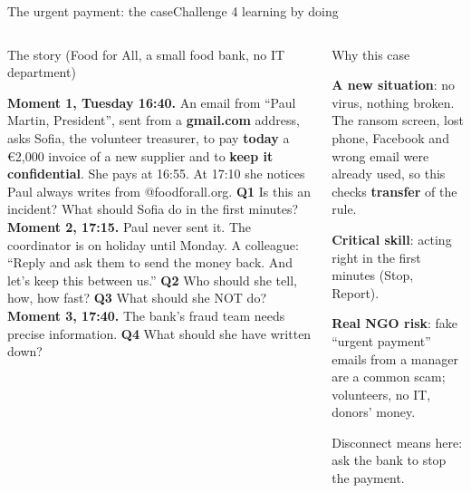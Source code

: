 \documentclass[aspectratio=169,11pt,t]{beamer}
\newcommand\explain[2]{%
  \begin{tcolorbox}[enhanced, colback=white, colframe=white, arc=2mm, boxrule=0pt, left=2.5mm, right=2.5mm, top=1.5mm, bottom=1.5mm,
      before skip=0pt, after skip=1.6mm, drop fuzzy shadow={black!30}, before upper=\raggedright]
    {\headfont\fontsize{8}{10}\selectfont\color{navy}#1\par}\vspace{.5mm}
    {\fontsize{7}{8.6}\selectfont #2\par}
  \end{tcolorbox}}
\newcommand\bul[2]{\par\noindent\makebox[3.5mm][l]{\textcolor{#1}{\tiny\faCircle}}\parbox[t]{\dimexpr\linewidth-3.5mm}{\raggedright #2}\par\vspace{.4mm}}
\begin{document}
\begin{frame}{The urgent payment: the case}{Challenge 4 \textbullet{} learning by doing}
  \vspace{1mm}
  \begin{columns}[T,onlytextwidth]
    \explain{The story (Food for All, a small food bank, no IT department)}{%
      \textbf{Moment 1, Tuesday 16:40.} An email from ``Paul Martin, President'', sent from a \textbf{gmail.com} address, asks Sofia, the volunteer treasurer, to pay \textbf{today} a €2,000 invoice of a new supplier and to \textbf{keep it confidential}. She pays at 16:55. At 17:10 she notices Paul always writes from @foodforall.org. \textbf{Q1} Is this an incident? What should Sofia do in the first minutes?\\[1mm]
      \textbf{Moment 2, 17:15.} Paul never sent it. The coordinator is on holiday until Monday. A colleague: ``Reply and ask them to send the money back. And let's keep this between us.'' \textbf{Q2} Who should she tell, how, how fast? \textbf{Q3} What should she NOT do?\\[1mm]
      \textbf{Moment 3, 17:40.} The bank's fraud team needs precise information. \textbf{Q4} What should she have written down?}
    \explain{Why this case}{%
      \bul{good}{\textbf{A new situation}: no virus, nothing broken. The ransom screen, lost phone, Facebook and wrong email were already used, so this checks \textbf{transfer} of the rule.}
      \bul{alert}{\textbf{Critical skill}: acting right in the first minutes (Stop, Report).}
      \bul{navy}{\textbf{Real NGO risk}: fake ``urgent payment'' emails from a manager are a common scam; volunteers, no IT, donors' money.}
      \bul{navydark}{Disconnect means here: ask the bank to stop the payment.}}
  \end{columns}
\end{frame}
\end{document}
